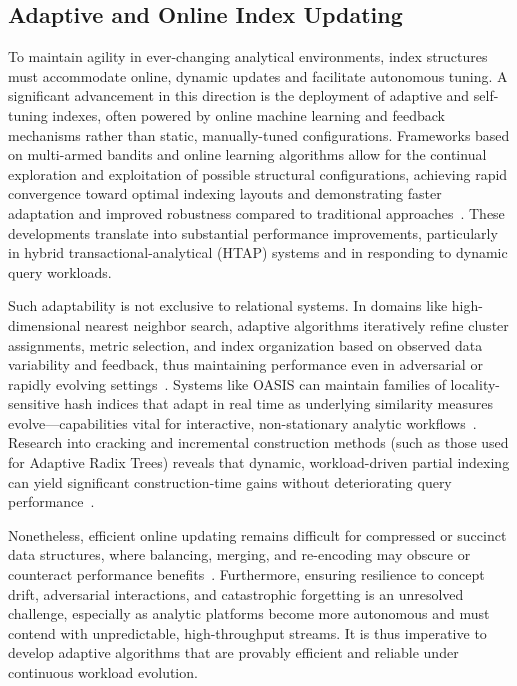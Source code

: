 \documentclass[sigconf]{acmart}
\begin{document}
\subsection{Adaptive and Online Index Updating}

To maintain agility in ever-changing analytical environments, index structures must accommodate online, dynamic updates and facilitate autonomous tuning. A significant advancement in this direction is the deployment of adaptive and self-tuning indexes, often powered by online machine learning and feedback mechanisms rather than static, manually-tuned configurations. Frameworks based on multi-armed bandits and online learning algorithms allow for the continual exploration and exploitation of possible structural configurations, achieving rapid convergence toward optimal indexing layouts and demonstrating faster adaptation and improved robustness compared to traditional approaches~\cite{ref79,ref80,ref105}. These developments translate into substantial performance improvements, particularly in hybrid transactional-analytical (HTAP) systems and in responding to dynamic query workloads.

Such adaptability is not exclusive to relational systems. In domains like high-dimensional nearest neighbor search, adaptive algorithms iteratively refine cluster assignments, metric selection, and index organization based on observed data variability and feedback, thus maintaining performance even in adversarial or rapidly evolving settings~\cite{ref110}. Systems like OASIS can maintain families of locality-sensitive hash indices that adapt in real time as underlying similarity measures evolve---capabilities vital for interactive, non-stationary analytic workflows~\cite{ref110}. Research into cracking and incremental construction methods (such as those used for Adaptive Radix Trees) reveals that dynamic, workload-driven partial indexing can yield significant construction-time gains without deteriorating query performance~\cite{ref109}.

Nonetheless, efficient online updating remains difficult for compressed or succinct data structures, where balancing, merging, and re-encoding may obscure or counteract performance benefits~\cite{ref80,ref81,ref82,ref108,ref109}. Furthermore, ensuring resilience to concept drift, adversarial interactions, and catastrophic forgetting is an unresolved challenge, especially as analytic platforms become more autonomous and must contend with unpredictable, high-throughput streams. It is thus imperative to develop adaptive algorithms that are provably efficient and reliable under continuous workload evolution.
\end{document}
